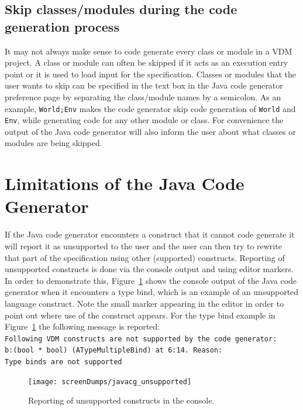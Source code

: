 \subsection{Skip classes/modules during the code generation process}

It may not always make sense to code generate every class or module in
a VDM project. A class or module can often be skipped if it acts as an
execution entry point or it is used to load input for the
specification. Classes or modules that the user wants to skip can be
specified in the text box in the Java code generator preference page
by separating the class/module names by a semicolon. As an example,
\texttt{World;Env} makes the code generator skip code generation of
\texttt{World} and \texttt{Env}, while generating code for any other
module or class. For convenience the output of the Java code generator
will also inform the user about what classes or modules are being
skipped.

\section{Limitations of the Java Code Generator}

If the Java code generator encounters a construct that it cannot code
generate it will report it as unsupported to the user and the user can
then try to rewrite that part of the specification using other
(supported) constructs. Reporting of unsupported constructs is done
via the console output and using editor markers. In order to
demonstrate this, Figure~\ref{fig:javacg_unsupported} shows the
console output of the Java code generator when it encounters a type
bind, which is an example of an unsupported language construct. Note
the small marker appearing in the editor in order to point out where
use of the construct appears. For the type bind example in
Figure~\ref{fig:javacg_unsupported} the following message is reported:\\

\noindent \texttt{Following VDM constructs are not supported by the
  code generator:\\ b:(bool * bool) (ATypeMultipleBind) at
  6:14. Reason:\\ Type binds are not supported}\\

\begin{figure}[htbp]
\begin{center}
\texttt{[image: screenDumps/javacg\_unsupported]}
\caption{Reporting of unsupported constructs in the
console.\label{fig:javacg_unsupported}}
\end{center}
\end{figure}

